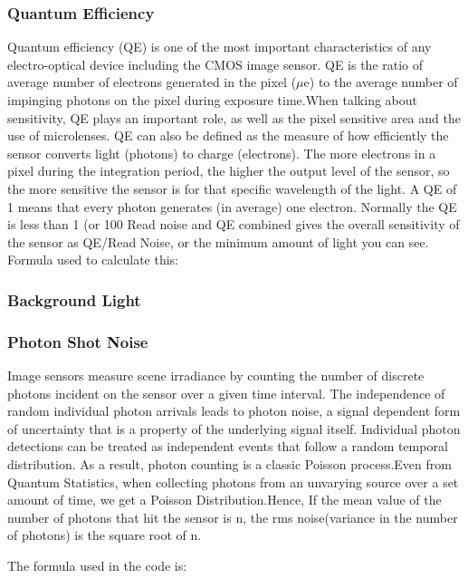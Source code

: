 \documentclass[../../main.tex]{subfiles}
\begin{document}
\subsubsection{Quantum Efficiency} %
Quantum efficiency (QE) is one of the most important characteristics of any electro-optical
device including the CMOS image sensor. QE is the ratio of average number of electrons
generated in the pixel ($\mu$e) to the average number of impinging photons %
on the pixel during exposure time.When talking about sensitivity, QE plays an important role, as well as
the pixel sensitive area and the use of microlenses. QE can also be defined as the 
measure of how efficiently the sensor converts light (photons) to charge
(electrons). The more electrons in a pixel during the integration period, the
higher the output level of the sensor, so the more sensitive the sensor is for
that specific wavelength of the light. A QE of 1 means that every photon
generates (in average) one electron. Normally the QE is less than 1 (or 100%
Read noise and QE combined gives the overall sensitivity of the sensor as QE/Read
Noise, or the minimum amount of light you can see.
Formula used to calculate this:


\subsubsection{Background Light} %
\blindtext

\subsubsection{Photon Shot Noise} %
Image sensors measure scene irradiance by counting the number of discrete photons incident on the sensor over a given time interval. The independence of random individual photon arrivals leads to photon noise, a signal dependent form of uncertainty that is a property of the underlying signal itself. Individual photon detections can be treated as independent events that follow a random temporal distribution. As a result, photon counting is a classic Poisson process.Even from Quantum Statistics, when collecting photons from an unvarying source over a set amount of time, we get a Poisson Distribution.Hence, If the mean value of the number of photons that hit the sensor is n, the rms noise(variance in the number of photons) is the square root of n.

The formula used in the code is: 
\end{document}
